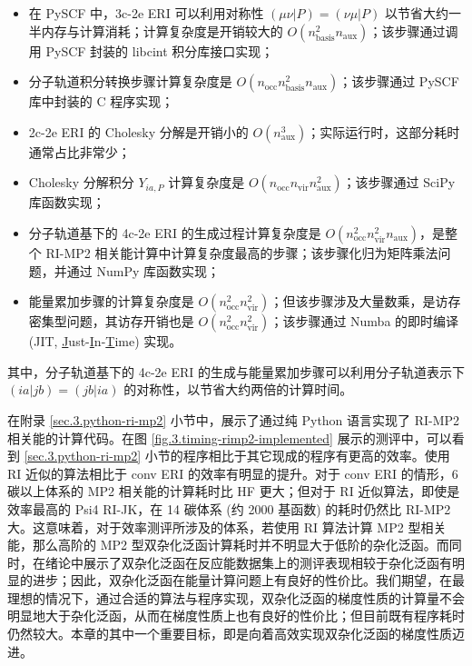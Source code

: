 \begin{itemize}[nosep]
  \item 在 PySCF 中，3c-2e ERI 可以利用对称性 $(\mu \nu | P) = (\nu \mu | P)$ 以节省大约一半内存与计算消耗；计算复杂度是开销较大的 $O(n_\mathrm{basis}^2 n_\mathrm{aux})$；该步骤通过调用 PySCF 封装的 libcint 积分库接口实现；
  \item 分子轨道积分转换步骤计算复杂度是 $O(n_\mathrm{occ} n_\mathrm{basis}^2 n_\mathrm{aux})$；该步骤通过 PySCF 库中封装的 C 程序实现；
  \item 2c-2e ERI 的 Cholesky 分解是开销小的 $O(n_\mathrm{aux}^3)$；实际运行时，这部分耗时通常占比非常少；
  \item Cholesky 分解积分 $Y_{ia, P}$ 计算复杂度是 $O(n_\mathrm{occ} n_\mathrm{vir} n_\mathrm{aux}^2)$；该步骤通过 SciPy 库函数实现；
  \item 分子轨道基下的 4c-2e ERI 的生成过程计算复杂度是 $O(n_\mathrm{occ}^2 n_\mathrm{vir}^2 n_\mathrm{aux})$，是整个 RI-MP2 相关能计算中计算复杂度最高的步骤；该步骤化归为矩阵乘法问题，并通过 NumPy 库函数实现；
  \item 能量累加步骤的计算复杂度是 $O(n_\mathrm{occ}^2 n_\mathrm{vir}^2)$；但该步骤涉及大量数乘，是访存密集型问题，其访存开销也是 $O(n_\mathrm{occ}^2 n_\mathrm{vir}^2)$；该步骤通过 Numba 的即时编译 (JIT, \underline{J}ust-\underline{I}n-\underline{T}ime) 实现。
\end{itemize}
其中，分子轨道基下的 4c-2e ERI 的生成与能量累加步骤可以利用分子轨道表示下 $(ia|jb) = (jb|ia)$ 的对称性，以节省大约两倍的计算时间。

在附录 \ref{sec.3.python-ri-mp2} 小节中，展示了通过纯 Python 语言实现了 RI-MP2 相关能的计算代码。在图 \ref{fig.3.timing-rimp2-implemented} 展示的测评中，可以看到 \ref{sec.3.python-ri-mp2} 小节的程序相比于其它现成的程序有更高的效率。使用 RI 近似的算法相比于 conv ERI 的效率有明显的提升。对于 conv ERI 的情形，6 碳以上体系的 MP2 相关能的计算耗时比 HF 更大；但对于 RI 近似算法，即使是效率最高的 Psi4 RI-JK，在 14 碳体系 (约 2000 基函数) 的耗时仍然比 RI-MP2 大。这意味着，对于效率测评所涉及的体系，若使用 RI 算法计算 MP2 型相关能，那么高阶的 MP2 型双杂化泛函计算耗时并不明显大于低阶的杂化泛函。而同时，\alert{在绪论中}展示了双杂化泛函在反应能数据集上的测评表现相较于杂化泛函有明显的进步；因此，双杂化泛函在能量计算问题上有良好的性价比。我们期望，在最理想的情况下，通过合适的算法与程序实现，双杂化泛函的梯度性质的计算量不会明显地大于杂化泛函，从而在梯度性质上也有良好的性价比；但目前既有程序耗时仍然较大。本章的其中一个重要目标，即是向着高效实现双杂化泛函的梯度性质迈进。

